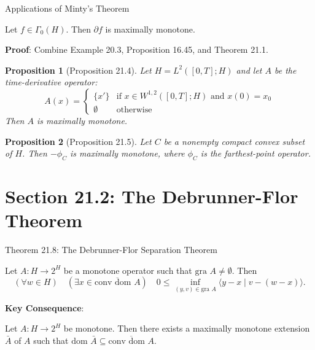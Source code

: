 \documentclass[aspectratio=169,10pt]{beamer}
\newtheorem{proposition}{Proposition}
\begin{document}
\begin{frame}{Applications of Minty's Theorem}
    \begin{theorem}[Theorem 21.2]
        Let $f \in \Gamma_0(H)$. Then $\partial f$ is maximally monotone.
    \end{theorem}

    \textbf{Proof}: Combine Example 20.3, Proposition 16.45, and Theorem 21.1.

    \vspace{1em}
    \begin{proposition}[Proposition 21.4]
        Let $H = L^2([0,T]; H)$ and let $A$ be the time-derivative operator:
        \[
            A(x) = \begin{cases} \{x'\} & \text{if } x \in W^{1,2}([0,T]; H) \text{ and } x(0) = x_0 \\
                   \emptyset & \text{otherwise} \end{cases}
        \]
        Then $A$ is maximally monotone.
    \end{proposition}

    \vspace{1em}
    \begin{proposition}[Proposition 21.5]
        Let $C$ be a nonempty compact convex subset of $H$. Then $-\phi_C$ is maximally monotone,
        where $\phi_C$ is the farthest-point operator.
    \end{proposition}
\end{frame}

\section{Section 21.2: The Debrunner-Flor Theorem}

\begin{frame}{Theorem 21.8: The Debrunner-Flor Separation Theorem}
    \begin{theorem}
        Let $A: H \to 2^H$ be a monotone operator such that $\text{gra } A \neq \emptyset$. Then
        \[
            \left(\forall w \in H\right) \quad \left(\exists x \in \overline{\text{conv dom } A}\right) \quad
            0 \leq \inf_{(y,v) \in \text{gra } A} \langle y - x \mid v - (w - x) \rangle.
        \]
    \end{theorem}

    \textbf{Key Consequence}:
    \begin{theorem}
        Let $A: H \to 2^H$ be monotone. Then there exists a maximally monotone extension $\bar{A}$
        of $A$ such that $\text{dom } \bar{A} \subseteq \overline{\text{conv dom } A}$.
    \end{theorem}
\end{frame}
\end{document}

